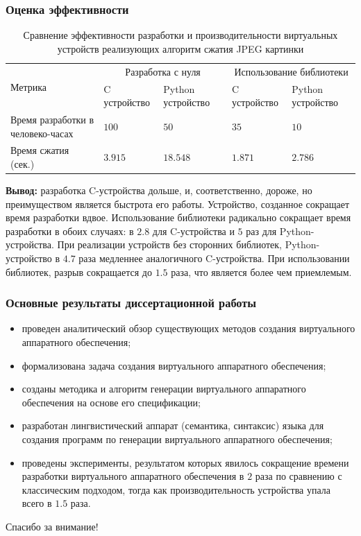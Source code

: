 \begin{frame}%
    \frametitle{Оценка эффективности}
    \small
    \begin{longtable}{| p{2cm} | p{1.5cm} | p{1.5cm} | p{1.5cm} | p{1cm} |}
        \caption{Сравнение эффективности разработки и производительности виртуальных устройств реализующих
                 алгоритм сжатия JPEG картинки} \\
        \hline
            \multirow{2}{*}{Метрика} &
            \multicolumn{2}{c|}{Разработка с нуля} &
            \multicolumn{2}{c|}{Использование библиотеки} \\
        \cline{2-5} &
            C устройство &
            Python устройство &
            C устройство &
            Python устройство \\
        \hline
            Время разработки в человеко-часах &
            $100$ &
            $50$ &
            $35$ &
            $10$ \\
        \hline
            Время сжатия (сек.)&
            $3.915$ &
            $18.548$ &
            $1.871$ &
            $2.786$ \\
        \hline
    \end{longtable}
    {\small
        \textbf{Вывод:} разработка C-устройства дольше, и, соответственно, дороже,
        но преимуществом является быстрота его работы.
        Устройство, созданное {\mylanguage} сокращает время разработки вдвое.
        Использование библиотеки радикально сокращает
        время разработки в обоих случаях: в $2.8$ для C-устройства и
        $5$ раз для Python-устройства.
        При реализации устройств без сторонних библиотек, Python-устройство
        в $4.7$ раза медленнее аналогичного C-устройства. При использовании
        библиотек, разрыв сокращается до $1.5$ раза, что является
        более чем приемлемым.
    }
\end{frame}


\begin{frame}%
    \frametitle{Основные результаты диссертационной работы}
    \begin{itemize}
        \item проведен аналитический обзор существующих методов создания виртуального аппаратного обеспечения;
        \item формализована задача создания виртуального аппаратного обеспечения;
        \item созданы методика и алгоритм генерации виртуального аппаратного обеспечения на основе его спецификации;
        \item разработан лингвистический аппарат (семантика, синтаксис) языка для создания программ по генерации виртуального
            аппаратного обеспечения;
        \item проведены эксперименты, результатом которых явилось сокращение времени разработки
            виртуального аппаратного обеспечения в $2$ раза по сравнению с классическим
            подходом, тогда как производительность устройства упала всего в $1.5$ раза.
    \end{itemize}
\end{frame}


\begin{frame}%
    \begin{center}
        \Huge Спасибо за внимание!
    \end{center}
\end{frame}
